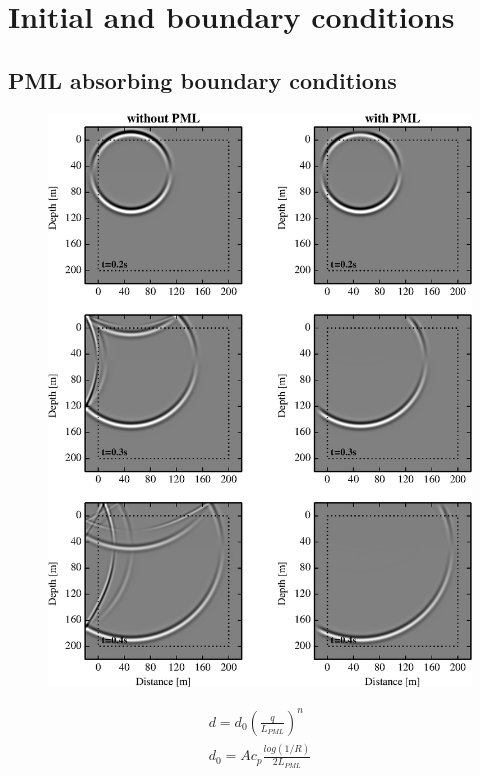 \documentclass{gnulike}
\begin{document}
\section{Initial and boundary conditions}

\subsection{PML absorbing boundary conditions}

\cite{berenger1994perfectly}

\begin{figure}[!ht]
  \centering
  \includegraphics[scale=1.0]{fig/validation_pml.eps}
\end{figure}

\begin{eqnarray}
\label{pml-damp}
d = d_{0} \left( \frac{q}{L_{PML}} \right) ^{n} \\
d_{0} = Ac_{p} \frac{log(1/R)}{2L_{PML}}
\end{eqnarray}
\end{document}
